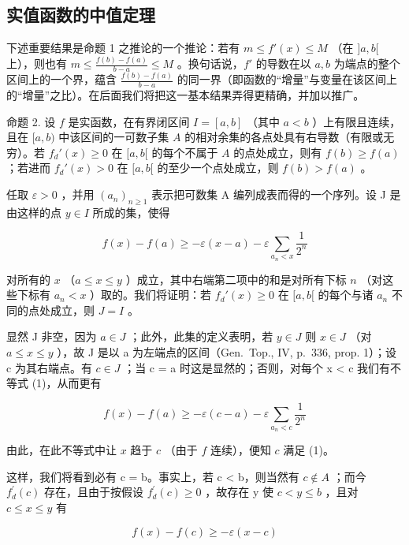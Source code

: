 \subsection{实值函数的中值定理}

下述重要结果是命题 1 之推论的一个推论：若有 \(m \leqslant f'(x) \leqslant M\) （在 \(]a, b[\) 上），则也有 \(m \leqslant \frac{f(b) - f(a)}{b - a} \leqslant M\) 。换句话说，\(f'\) 的导数在以 \(a, b\) 为端点的整个区间上的一个界，蕴含 \(\frac{f(b) - f(a)}{b - a}\) 的同一界（即函数的“增量”与变量在该区间上的“增量”之比）。在后面我们将把这一基本结果弄得更精确，并加以推广。

命题 2. 设 \(f\) 是实函数，在有界闭区间 \(I = [a, b]\) （其中 \(a < b\) ）上有限且连续，且在 \([a, b)\) 中该区间的一可数子集 \(A\) 的相对余集的各点处具有右导数（有限或无穷）。若 \(f_d'(x) \geqslant 0\) 在 \([a, b[\) 的每个不属于 \(A\) 的点处成立，则有 \(f(b) \geqslant f(a)\) ；若进而 \(f_d'(x) > 0\) 在 \([a, b[\) 的至少一个点处成立，则 \(f(b) > f(a)\) 。

任取 \(\varepsilon > 0\) ，并用 \((a_n)_{n \geqslant 1}\) 表示把可数集 A 编列成表而得的一个序列。设 J 是由这样的点 \(y \in I\) 所成的集，使得

\[
f (x) - f (a) \geqslant - \varepsilon (x - a) - \varepsilon \sum_ {a _ {n} <   x} \frac {1}{2 ^ {n}}\tag{1}
\]

对所有的 \(x\) （\(a \leqslant x \leqslant y\) ）成立，其中右端第二项中的和是对所有下标 \(n\) （对这些下标有 \(a_n < x\) ）取的。我们将证明：若 \(f_d'(x) \geqslant 0\) 在 \([a, b[\) 的每个与诸 \(a_n\) 不同的点处成立，则 \(J = I\) 。

显然 J 非空，因为 \(a \in J\) ；此外，此集的定义表明，若 \(y \in J\) 则 \(x \in J\) （对 \(a \leqslant x \leqslant y\) ），故 J 是以 a 为左端点的区间（Gen.~Top., IV, p.~336, prop. 1）；设 c 为其右端点。有 \(c \in J\) ；当 c = a 时这是显然的；否则，对每个 x \textless{} c 我们有不等式 (1)，从而更有

\[
f (x) - f (a) \geqslant - \varepsilon (c - a) - \varepsilon \sum_ {a _ {n} <   c} \frac {1}{2 ^ {n}}
\]

由此，在此不等式中让 \(x\) 趋于 \(c\) （由于 \(f\) 连续），便知 \(c\) 满足 (1)。

这样，我们将看到必有 c = b。事实上，若 c \textless{} b，则当然有 \(c \notin A\) ；而今 \(f_{d}^{\prime}(c)\) 存在，且由于按假设 \(f_{d}^{\prime}(c) \geqslant 0\) ，故存在 y 使 \(c < y \leqslant b\) ，且对 \(c \leqslant x \leqslant y\) 有

\[
f (x) - f (c) \geqslant - \varepsilon (x - c)
\]

